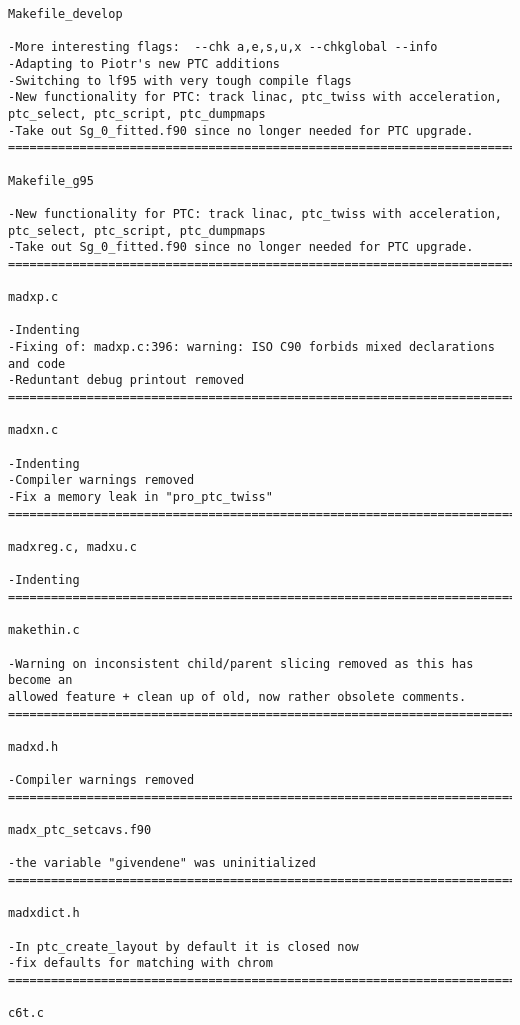 \begin{verbatim}
Makefile_develop

-More interesting flags:  --chk a,e,s,u,x --chkglobal --info
-Adapting to Piotr's new PTC additions
-Switching to lf95 with very tough compile flags
-New functionality for PTC: track linac, ptc_twiss with acceleration, 
ptc_select, ptc_script, ptc_dumpmaps
-Take out Sg_0_fitted.f90 since no longer needed for PTC upgrade.
=============================================================================

Makefile_g95

-New functionality for PTC: track linac, ptc_twiss with acceleration, 
ptc_select, ptc_script, ptc_dumpmaps
-Take out Sg_0_fitted.f90 since no longer needed for PTC upgrade.
=============================================================================

madxp.c

-Indenting
-Fixing of: madxp.c:396: warning: ISO C90 forbids mixed declarations and code
-Reduntant debug printout removed
=============================================================================

madxn.c

-Indenting
-Compiler warnings removed
-Fix a memory leak in "pro_ptc_twiss"
=============================================================================

madxreg.c, madxu.c

-Indenting
=============================================================================

makethin.c

-Warning on inconsistent child/parent slicing removed as this has become an 
allowed feature + clean up of old, now rather obsolete comments.
=============================================================================

madxd.h

-Compiler warnings removed
=============================================================================

madx_ptc_setcavs.f90

-the variable "givendene" was uninitialized
=============================================================================

madxdict.h

-In ptc_create_layout by default it is closed now
-fix defaults for matching with chrom
=============================================================================

c6t.c


\end{verbatim}
